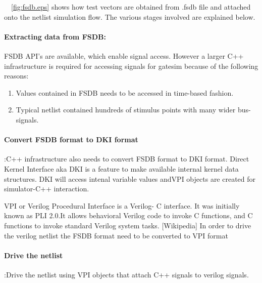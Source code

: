 ~\figurename{~\ref{fig:fsdb.eps}} shows how test vectors are obtained from .fsdb file and attached onto the netlist simulation flow. The various stages involved are explained below.
\paragraph{Extracting data from FSDB:}FSDB API's are available, which enable signal access. However a larger C++ infrastructure is required for accessing signals for gatesim because of the following reasons:
\begin{enumerate}
	\item Values contained in FSDB needs to be accessed in time-based fashion.
	\item Typical netlist contained hundreds of stimulus points with many wider bus-signals.
\end{enumerate}

\paragraph{Convert FSDB format to DKI format}:C++ infrastructure also needs to convert FSDB format to DKI format. 
Direct Kernel Interface aka DKI is a feature to make available internal kernel data structures. DKI will access intenal variable values andVPI objects are created for simulator-C++ interaction.

VPI or Verilog Procedural Interface is a Verilog- C interface. It was initially known as PLI 2.0.It allows behavioral Verilog code to invoke C functions, and C functions to invoke standard Verilog system tasks. [Wikipedia] In order to drive the verilog netlist the FSDB format need to be converted to VPI format

\paragraph{Drive the netlist}:Drive the netlist using VPI objects that attach C++ signals to verilog signals. 

